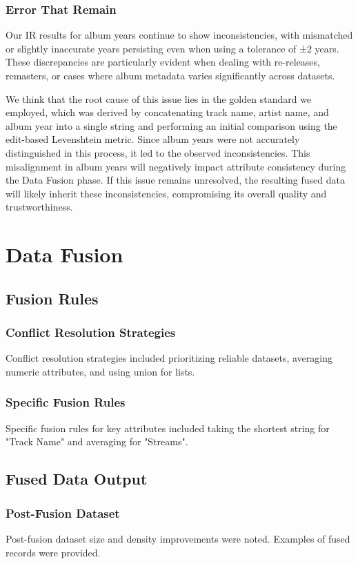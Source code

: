 \documentclass[runningheads]{llncs}
\begin{document}
\subsubsection{Error That Remain}

Our IR results for album years continue to show inconsistencies, with mismatched or slightly inaccurate years persisting even when using a tolerance of ±2 years. These discrepancies are particularly evident when dealing with re-releases, remasters, or cases where album metadata varies significantly across datasets.

We think that the root cause of this issue lies in the golden standard we employed, which was derived by concatenating track name, artist name, and album year into a single string and performing an initial comparison using the edit-based Levenshtein metric. Since album years were not accurately distinguished in this process, it led to the observed inconsistencies. This misalignment in album years will negatively impact attribute consistency during the Data Fusion phase. If this issue remains unresolved, the resulting fused data will likely inherit these inconsistencies, compromising its overall quality and trustworthiness.
\section{Data Fusion}
\subsection{Fusion Rules}
\subsubsection{Conflict Resolution Strategies}
Conflict resolution strategies included prioritizing reliable datasets, averaging numeric attributes, and using union for lists.

\subsubsection{Specific Fusion Rules}
Specific fusion rules for key attributes included taking the shortest string for "Track Name" and averaging for "Streams".

\subsection{Fused Data Output}
\subsubsection{Post-Fusion Dataset}
Post-fusion dataset size and density improvements were noted. Examples of fused records were provided.
\end{document}
